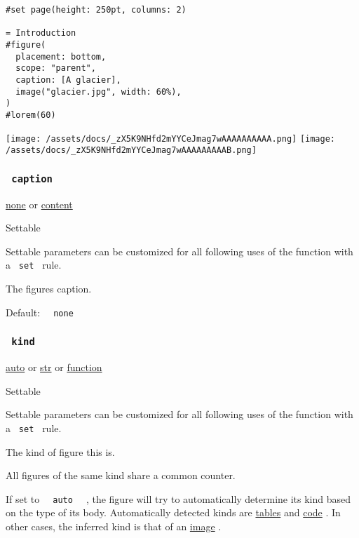 \begin{verbatim}
#set page(height: 250pt, columns: 2)

= Introduction
#figure(
  placement: bottom,
  scope: "parent",
  caption: [A glacier],
  image("glacier.jpg", width: 60%),
)
#lorem(60)
\end{verbatim}

\texttt{[image: /assets/docs/\_zX5K9NHfd2mYYCeJmag7wAAAAAAAAAA.png]}
\texttt{[image: /assets/docs/\_zX5K9NHfd2mYYCeJmag7wAAAAAAAAAB.png]}

\subsubsection{\texorpdfstring{\texttt{\ caption\ }}{ caption }}\label{parameters-caption}

\href{/docs/reference/foundations/none/}{none} {or}
\href{/docs/reference/foundations/content/}{content}

{{ Settable }}

\label{parameters-caption-settable-tooltip}
Settable parameters can be customized for all following uses of the
function with a \texttt{\ set\ } rule.

The figure\textquotesingle s caption.

Default: \texttt{\ }{\texttt{\ none\ }}\texttt{\ }

\subsubsection{\texorpdfstring{\texttt{\ kind\ }}{ kind }}\label{parameters-kind}

\href{/docs/reference/foundations/auto/}{auto} {or}
\href{/docs/reference/foundations/str/}{str} {or}
\href{/docs/reference/foundations/function/}{function}

{{ Settable }}

\label{parameters-kind-settable-tooltip}
Settable parameters can be customized for all following uses of the
function with a \texttt{\ set\ } rule.

The kind of figure this is.

All figures of the same kind share a common counter.

If set to \texttt{\ }{\texttt{\ auto\ }}\texttt{\ } , the figure will
try to automatically determine its kind based on the type of its body.
Automatically detected kinds are
\href{/docs/reference/model/table/}{tables} and
\href{/docs/reference/text/raw/}{code} . In other cases, the inferred
kind is that of an \href{/docs/reference/visualize/image/}{image} .

